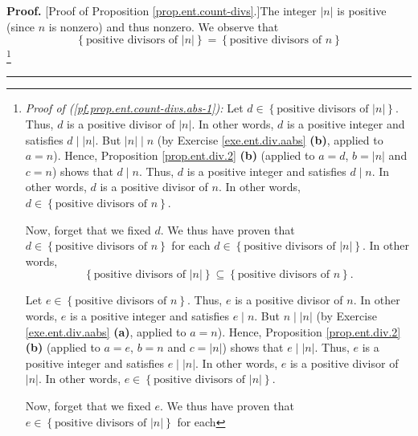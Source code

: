 \documentclass[numbers=enddot,12pt,final,onecolumn,notitlepage]{scrartcl}%
\numberwithin{exer}{subsection}
\theoremstyle{definition}
\newenvironment{proof}[1][Proof]{\noindent\textbf{#1.} }{\ \rule{0.5em}{0.5em}}
\begin{document}
\begin{proof}
[Proof of Proposition \ref{prop.ent.count-divs}.]The integer $\left\vert
n\right\vert $ is positive (since $n$ is nonzero) and thus nonzero. We observe
that%
\begin{equation}
\left\{  \text{positive divisors of }\left\vert n\right\vert \right\}
=\left\{  \text{positive divisors of }n\right\}
\label{pf.prop.ent.count-divs.abs-1}%
\end{equation}
\footnote{\textit{Proof of (\ref{pf.prop.ent.count-divs.abs-1}):} Let
$d\in\left\{  \text{positive divisors of }\left\vert n\right\vert \right\}  $.
Thus, $d$ is a positive divisor of $\left\vert n\right\vert $. In other words,
$d$ is a positive integer and satisfies $d\mid\left\vert n\right\vert $. But
$\left\vert n\right\vert \mid n$ (by Exercise \ref{exe.ent.div.aabs}
\textbf{(b)}, applied to $a=n$). Hence, Proposition \ref{prop.ent.div.2}
\textbf{(b)} (applied to $a=d$, $b=\left\vert n\right\vert $ and $c=n$) shows
that $d\mid n$. Thus, $d$ is a positive integer and satisfies $d\mid n$. In
other words, $d$ is a positive divisor of $n$. In other words, $d\in\left\{
\text{positive divisors of }n\right\}  $.
\par
Now, forget that we fixed $d$. We thus have proven that $d\in\left\{
\text{positive divisors of }n\right\}  $ for each $d\in\left\{  \text{positive
divisors of }\left\vert n\right\vert \right\}  $. In other words,%
\begin{equation}
\left\{  \text{positive divisors of }\left\vert n\right\vert \right\}
\subseteq\left\{  \text{positive divisors of }n\right\}  .
\label{pf.prop.ent.count-divs.abs-1.pf.1}%
\end{equation}
\par
Let $e\in\left\{  \text{positive divisors of }n\right\}  $. Thus, $e$ is a
positive divisor of $n$. In other words, $e$ is a positive integer and
satisfies $e\mid n$. But $n\mid\left\vert n\right\vert $ (by Exercise
\ref{exe.ent.div.aabs} \textbf{(a)}, applied to $a=n$). Hence, Proposition
\ref{prop.ent.div.2} \textbf{(b)} (applied to $a=e$, $b=n$ and $c=\left\vert
n\right\vert $) shows that $e\mid\left\vert n\right\vert $. Thus, $e$ is a
positive integer and satisfies $e\mid\left\vert n\right\vert $. In other
words, $e$ is a positive divisor of $\left\vert n\right\vert $. In other
words, $e\in\left\{  \text{positive divisors of }\left\vert n\right\vert
\right\}  $.
\par
Now, forget that we fixed $e$. We thus have proven that $e\in\left\{
\text{positive divisors of }\left\vert n\right\vert \right\}  $ for each
}
\end{proof}
\end{document}
